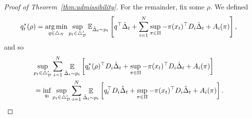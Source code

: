 \documentclass{article}
\newcommand{\rel}{\mathbf{Rel}}
\newcommand{\hist}{{\mathcal H}}
\begin{document}
\begin{proof}[Proof of Theorem~\ref{thm:admissibility}]
For the remainder, fix some $\rho$. We defined
\[
  q_t^*(\rho)
  =
  \operatorname*{arg\,min}_{q \in \triangle_{N}}
  \sup_{p_t \in \triangle_{\mathcal D}'}
  \mathbb E_{\hat\Delta_t\sim p_t}\left[
  q^\top \hat \Delta_t
    +
    \sum_{i=1}^N \sup_{\pi\in\Pi} -\pi(x_t)^\top D_i\hat\Delta_t + A_i(\pi)\right],
  \]
  and so
  \begin{align*}
    &\lefteqn{\sup_{p_t\in\triangle_{\mathcal D}'}\sum_{i=1}^N \mathop{\ex}_{\hat\Delta_t\sim p_t}\left[ q_t^*(\rho)^\top D_i \hat \Delta_t
    +
  \sup_{\pi\in\Pi} -\pi(x_t)^\top D_i\hat\Delta_t + A_i(\pi)\right]}\\
    &=
      \inf_{q_t}
      \sup_{p_t\in\triangle_{\mathcal D}'}\sum_{i=1}^N \mathop{\ex}_{\hat\Delta_t\sim p_t}\left[ q_t^\top D_i \hat \Delta_t
    +
  \sup_{\pi\in\Pi} -\pi(x_t)^\top D_i\hat\Delta_t + A_i(\pi)\right].
\end{align*}


\end{proof}
\end{document}

